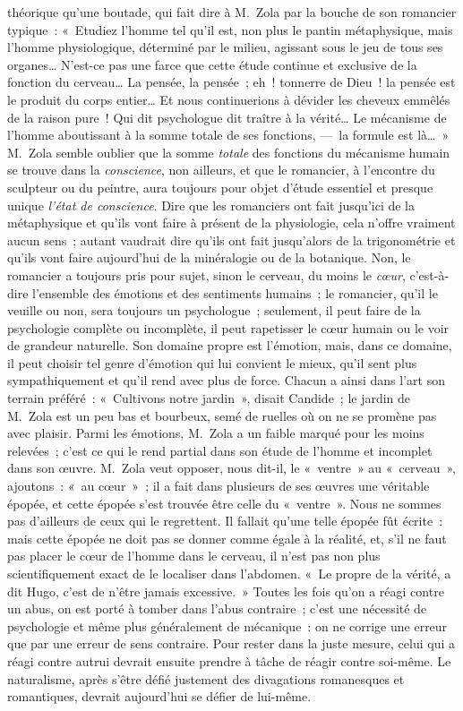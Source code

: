 \documentclass[french,twoside]{book} %
\begin{document}
théorique qu’une boutade, qui fait dire à M. Zola par la bouche de son romancier typique : « Etudiez l’homme tel qu’il est, non plus le pantin métaphysique, mais l’homme physiologique, déterminé par le milieu, agissant sous le jeu de tous ses organes… N’est-ce pas une farce que cette étude continue et exclusive de la fonction du cerveau… La pensée, la pensée ; eh ! tonnerre de Dieu ! la pensée est le produit du corps entier… Et nous continuerions à dévider les cheveux emmêlés de la raison pure ! Qui dit psychologue dit traître à la vérité… Le mécanisme de l’homme aboutissant à la somme totale de ses fonctions, — la formule est là… » M. Zola semble oublier que la somme \emph{totale} des fonctions du mécanisme humain se trouve dans la \emph{conscience}, non ailleurs, et que le romancier, à l’encontre du sculpteur ou du peintre, aura toujours pour objet d’étude essentiel et presque unique \emph{l’état de conscience}. Dire que les romanciers ont fait jusqu’ici de la métaphysique et qu’ils vont faire à présent de la physiologie, cela n’offre vraiment aucun sens ; autant vaudrait dire qu’ils ont fait jusqu’alors de la trigonométrie et qu’ils vont faire aujourd’hui de la minéralogie ou de la botanique. Non, le romancier a toujours pris pour sujet, sinon le cerveau, du moins le \emph{cœur}, c’est-à-dire l’ensemble des émotions et des sentiments humains ; le romancier, qu’il le veuille ou non, sera toujours un psychologue ; seulement, il peut faire de la psychologie complète ou incomplète, il peut rapetisser le cœur humain ou le voir de grandeur naturelle. Son domaine propre est l’émotion, mais, dans ce domaine, il peut choisir tel genre d’émotion qui lui convient le mieux, qu’il sent plus sympathiquement et qu’il rend avec plus de force. Chacun a ainsi dans l’art son terrain préféré : « Cultivons notre jardin », disait Candide ; le jardin de M. Zola est un peu bas et bourbeux, semé de ruelles où on ne se promène pas avec plaisir. Parmi les émotions, M. Zola a un faible marqué pour les moins relevées ; c’est ce qui le rend partial dans son étude de l’homme et incomplet dans son œuvre. M. Zola veut opposer, nous dit-il, le « ventre » au « cerveau », ajoutons : « au cœur » ; il a fait dans plusieurs de ses œuvres une véritable épopée, et cette épopée s’est trouvée être celle du « ventre ». Nous ne sommes pas d’ailleurs de ceux qui le regrettent. Il fallait qu’une telle épopée fût écrite : mais cette épopée ne doit pas se donner comme égale à la réalité, et, s’il ne faut pas placer le cœur de l’homme dans le cerveau, il n’est pas non plus scientifiquement exact de le localiser dans l’abdomen. « Le propre de la vérité, a dit Hugo, c’est de n’être jamais excessive. » Toutes les fois qu’on a réagi contre un abus, on est porté à tomber dans l’abus contraire ; c’est une nécessité de psychologie et même plus généralement de mécanique : on ne corrige une erreur que par une erreur de sens contraire. Pour rester dans la juste mesure, celui qui a réagi contre autrui devrait ensuite prendre à tâche de réagir contre soi-même. Le naturalisme, après s’être défié justement des divagations romanesques et romantiques, devrait aujourd’hui se défier de lui-même.\par
\end{document}
